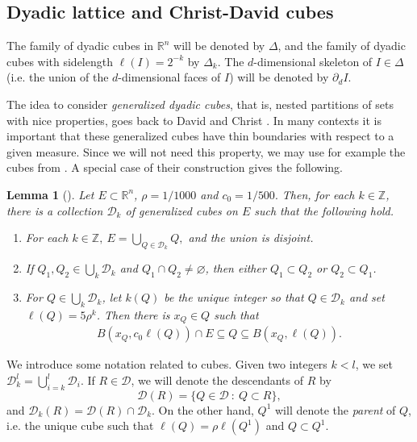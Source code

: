 \documentclass[11pt,reqno]{amsart}
\renewcommand{\d}{{\partial}}
\newtheorem{lemma}[theorem]{Lemma}
\theoremstyle{definition}
\theoremstyle{remark}
\numberwithin{equation}{section}
\newcommand{\R}{\mathbb{R}}
\newcommand{\Z}{\mathbb{Z}}
\newcommand{\dD}{\mathcal{D}}
\newcommand{\DD}{\mathcal{D}}
\theoremstyle{theorem}
\theoremstyle{definition}
\theoremstyle{remark}
\numberwithin{equation}{section}
\begin{document}
	
	\subsection{Dyadic lattice and Christ-David cubes}
	The family of dyadic cubes in $\R^n$ will be denoted by $\Delta$, and the family of dyadic cubes with sidelength $\ell(I)=2^{-k}$ by $\Delta_k$. The $d$-dimensional skeleton of $I\in\Delta$ (i.e. the union of the $d$-dimensional faces of $I$) will be denoted by $\d_d I$.
	
	The idea to consider \emph{generalized dyadic cubes}, that is, nested partitions of sets with nice properties, goes back to David \cite{david1988morceaux} and Christ \cite{christ1990tb}. In many contexts it is important that these generalized cubes have thin boundaries with respect to a given measure. Since we will not need this property, we may use for example the cubes from \cite{kaenmaki2012existence}. A special case of their construction gives the following.
	\begin{lemma}[\cite{kaenmaki2012existence}] \label{theorem:christ}
		Let $E\subset\R^n$, $\rho = 1/1000$ and $c_0 = 1/500.$ Then, for each $k \in \Z$, there is a collection $\dD_k$ of generalized cubes on $E$ such that the following hold.
		\begin{enumerate}
			\item For each $k \in \Z, \ E = \bigcup_{Q \in \dD_k}Q,$ and the union is disjoint.
			\item If $Q_1, Q_2 \in \bigcup_k \dD_k$ and $Q_1 \cap Q_2\neq \varnothing$, then either $Q_1 \subset Q_2$ or $Q_2 \subset Q_1$.
			\item For $Q \in \bigcup_k \dD_k$, let $k(Q)$ be the unique integer so that $Q \in \dD_k$ and set $\ell(Q)=5 \rho^k$. Then there is $x_Q \in Q$ such that 
			\begin{align*}
			B(x_Q,c_0\ell(Q))\cap E \subseteq Q \subseteq B(x_Q , \ell(Q)).
			\end{align*}
		\end{enumerate}
	\end{lemma}
	
	We introduce some notation related to cubes. Given two integers $k<l$, we set $\DD_k^l = \bigcup_{i=k}^l \DD_i$. If $R\in\DD$, we will denote the descendants of $R$ by
	\begin{equation*}
	\DD(R)=\{Q\in\DD\ :\ Q\subset R \},
	\end{equation*}
	and $\DD_k(R)=\DD(R)\cap\DD_k$. On the other hand, $Q^1$ will denote the \emph{parent} of $Q$, i.e. the unique cube such that $\ell(Q)=\rho\ell(Q^1)$ and $Q\subset Q^1$. 
	
\end{document}
